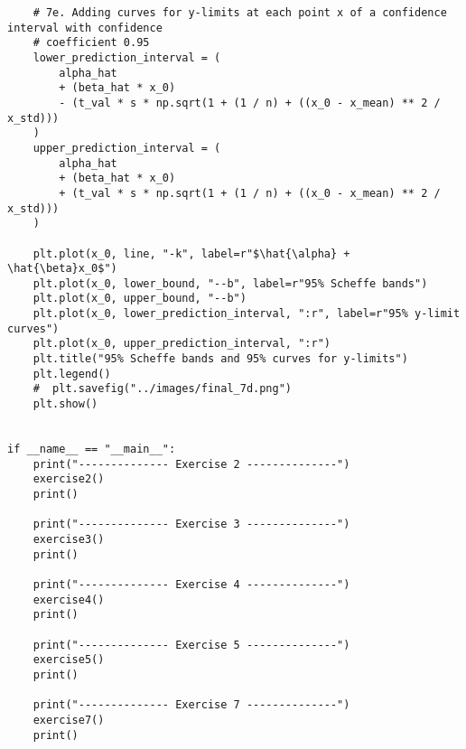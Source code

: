 \documentclass[letterpaper, 12pt]{article}
\begin{document}
\begin{lstlisting}
    # 7e. Adding curves for y-limits at each point x of a confidence interval with confidence
    # coefficient 0.95
    lower_prediction_interval = (
        alpha_hat
        + (beta_hat * x_0)
        - (t_val * s * np.sqrt(1 + (1 / n) + ((x_0 - x_mean) ** 2 / x_std)))
    )
    upper_prediction_interval = (
        alpha_hat
        + (beta_hat * x_0)
        + (t_val * s * np.sqrt(1 + (1 / n) + ((x_0 - x_mean) ** 2 / x_std)))
    )

    plt.plot(x_0, line, "-k", label=r"$\hat{\alpha} + \hat{\beta}x_0$")
    plt.plot(x_0, lower_bound, "--b", label=r"95% Scheffe bands")
    plt.plot(x_0, upper_bound, "--b")
    plt.plot(x_0, lower_prediction_interval, ":r", label=r"95% y-limit curves")
    plt.plot(x_0, upper_prediction_interval, ":r")
    plt.title("95% Scheffe bands and 95% curves for y-limits")
    plt.legend()
    #  plt.savefig("../images/final_7d.png")
    plt.show()


if __name__ == "__main__":
    print("-------------- Exercise 2 --------------")
    exercise2()
    print()

    print("-------------- Exercise 3 --------------")
    exercise3()
    print()

    print("-------------- Exercise 4 --------------")
    exercise4()
    print()

    print("-------------- Exercise 5 --------------")
    exercise5()
    print()

    print("-------------- Exercise 7 --------------")
    exercise7()
    print()
\end{lstlisting}
\end{document}
